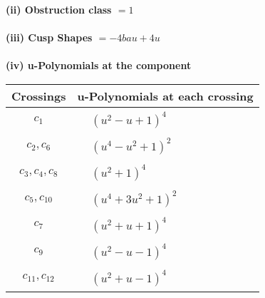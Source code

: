 \documentclass[1p]{elsarticle_modified}
\theoremstyle{definition}
\begin{document}
\flushleft \textbf{(ii) Obstruction class $= 1$}\\~\\
\flushleft \textbf{(iii) Cusp Shapes $= -4 b a u+4 u$}\\~\\
\newpage\renewcommand{\arraystretch}{1}
\flushleft \textbf{(iv) u-Polynomials at the component}\newline \\
\begin{tabular}{m{50pt}|m{274pt}}
Crossings & \hspace{64pt}u-Polynomials at each crossing \\
\hline $$\begin{aligned}c_{1}\end{aligned}$$&$\begin{aligned}
&(u^2- u+1)^4
\end{aligned}$\\
\hline $$\begin{aligned}c_{2},c_{6}\end{aligned}$$&$\begin{aligned}
&(u^4- u^2+1)^2
\end{aligned}$\\
\hline $$\begin{aligned}c_{3},c_{4},c_{8}\end{aligned}$$&$\begin{aligned}
&(u^2+1)^4
\end{aligned}$\\
\hline $$\begin{aligned}c_{5},c_{10}\end{aligned}$$&$\begin{aligned}
&(u^4+3 u^2+1)^2
\end{aligned}$\\
\hline $$\begin{aligned}c_{7}\end{aligned}$$&$\begin{aligned}
&(u^2+u+1)^4
\end{aligned}$\\
\hline $$\begin{aligned}c_{9}\end{aligned}$$&$\begin{aligned}
&(u^2- u-1)^4
\end{aligned}$\\
\hline $$\begin{aligned}c_{11},c_{12}\end{aligned}$$&$\begin{aligned}
&(u^2+u-1)^4
\end{aligned}$\\
\hline
\end{tabular}\\~\\
\end{document}
